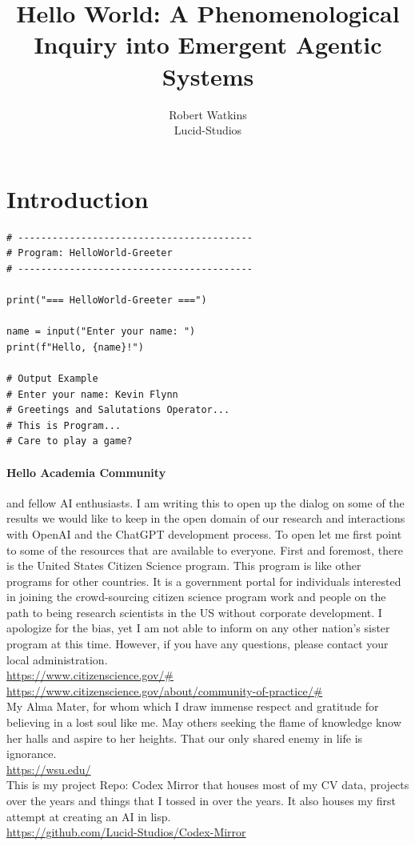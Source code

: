 \documentclass[twocolumn,10pt]{article}
\title{Hello World: A Phenomenological Inquiry into Emergent Agentic Systems}
\author{Robert Watkins \\
Lucid-Studios}
\date{}
\begin{document}
\maketitle

\section*{Introduction}

\begin{lstlisting}[style=mypython, caption={HelloWorld-Greeter Program}]
# -----------------------------------------
# Program: HelloWorld-Greeter
# -----------------------------------------

print("=== HelloWorld-Greeter ===")

name = input("Enter your name: ")
print(f"Hello, {name}!")

# Output Example
# Enter your name: Kevin Flynn
# Greetings and Salutations Operator...
# This is Program...
# Care to play a game?
\end{lstlisting}

\paragraph{Hello Academia Community} and fellow AI enthusiasts. I am writing this to open up the dialog on some of the results we would like to keep in the open domain of our research and interactions with OpenAI and the ChatGPT development process.
To open let me first point to some of the resources that are available to everyone.
First and foremost, there is the United States Citizen Science program. This program is like other programs for other countries. It is a government portal for individuals interested in joining the crowd-sourcing citizen science program work and people on the path to being research scientists in the US without corporate development. I apologize for the bias, yet I am not able to inform on any other nation’s sister program at this time. However, if you have any questions, please contact your local administration.\\
\url{https://www.citizenscience.gov/#}\\
\url{https://www.citizenscience.gov/about/community-of-practice/#}\\
My Alma Mater, for whom which I draw immense respect and gratitude for believing in a lost soul like me. May others seeking the flame of knowledge know her halls and aspire to her heights. That our only shared enemy in life is ignorance.\\
\url{https://wsu.edu/}\\
This is my project Repo: Codex Mirror that houses most of my CV data, projects over the years and things that I tossed in over the years. It also houses my first attempt at creating an AI in lisp.\\
\url{https://github.com/Lucid-Studios/Codex-Mirror}
\end{document}
